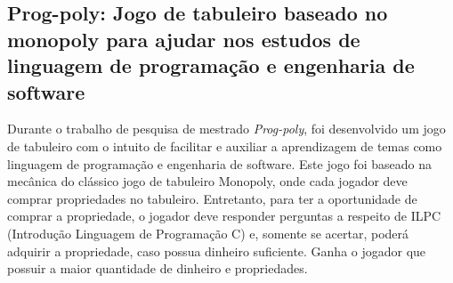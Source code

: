 \subsection{Prog-poly: Jogo de tabuleiro baseado no monopoly para ajudar nos estudos de linguagem de programação e engenharia de software}

Durante o trabalho de pesquisa de mestrado \textit{Prog-poly}, foi desenvolvido um jogo de tabuleiro com o intuito de facilitar e auxiliar a aprendizagem de temas como linguagem de programação e engenharia de software. Este jogo foi baseado na mecânica do clássico jogo de tabuleiro Monopoly, onde cada jogador deve comprar propriedades no tabuleiro. Entretanto, para ter a oportunidade de comprar a propriedade, o jogador deve responder perguntas a respeito de ILPC (Introdução Linguagem de Programação C) e, somente se acertar, poderá adquirir a propriedade, caso possua dinheiro suficiente. Ganha o jogador que possuir a maior quantidade de dinheiro e propriedades. \cite{nascimento2022prog}


